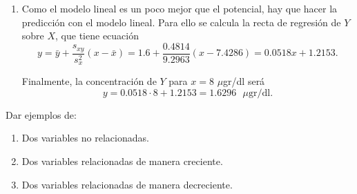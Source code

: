 {\begin{enumerate}
Y el coeficiente de determinación potencial vale:
\begin{align*}
\bar u &= \frac{\sum u_i}{n} = \frac{0.7419+\cdots+2.2192}{7} = \frac{13.1955}{7} = 1.8851 \text{ $\ln(\mu$gr/dl)},\\
s_u^2 &= \frac{\sum u_i^2}{n}-\bar u^2 = \frac{0.7419^2+\cdots+2.2192^2}{7} -1.8851^2= \frac{26.9397}{7}-3.5536 = 0.295 \text{ $\ln^2(\mu$gr/dl)},\\
\bar v &= \frac{\sum v_j}{n} = \frac{0.2624+\cdots+0.5306}{7} = \frac{3.253}{7} = 0.4647 \text{ $\ln(\mu$gr/dl)},\\
s_v^2 &= \frac{\sum v_j^2}{n}-\bar v^2 = \frac{0.2624^2+\cdots+0.5306^2}{7} -0.4647^2= \frac{1.5878}{7}-0.2159 = 0.0109 \text{ $\ln^2(\mu$gr/dl)},\\
s_{uv} &= \frac{\sum u_iv_j}{n}-\bar u\bar v = \frac{0.7419\cdot0.2624+\cdots+2.2192\cdot0.5306}{7}-1.8851\cdot0.4647 =\\
&= \frac{6.5224}{7}-0.876 = 0.0557 \text{ $\ln^2(\mu$gr/dl)},\\
r^2 &= \frac{s_{uv}^2}{s_u^2 s_v^2} = \frac{0.0557^2}{0.295\cdot 0.0109} = 0.9688.
\end{align*}

Así pues, el modelo potencial también es muy buen modelo para explicar la relación entre $Y$ y $X$ aunque es un poco mejor el lineal.

\item Como el modelo lineal es un poco mejor que el potencial, hay que hacer la predicción con el modelo lineal. Para ello se calcula la recta
de regresión de $Y$ sobre $X$, que tiene ecuación
\[
y = \bar y +\frac{s_{xy}}{s_x^2}(x-\bar x) = 1.6 + \frac{0.4814}{9.2963}(x-7.4286) = 0.0518x+1.2153.
\]

Finalmente, la concentración de $Y$ para $x=8$ $\mu$gr/dl será
\[
y = 0.0518\cdot 8+1.2153 = 1.6296 \text{ $\mu$gr/dl}.
\]
\end{enumerate}
}


{Dar ejemplos de:
\begin{enumerate}
\item Dos variables no relacionadas. 
\item Dos variables relacionadas de manera creciente. 
\item Dos variables relacionadas de manera decreciente. 
\end{enumerate}
}


